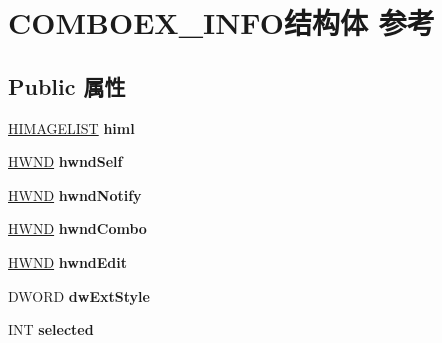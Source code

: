 \hypertarget{struct_c_o_m_b_o_e_x___i_n_f_o}{}\section{C\+O\+M\+B\+O\+E\+X\+\_\+\+I\+N\+F\+O结构体 参考}
\label{struct_c_o_m_b_o_e_x___i_n_f_o}
\subsection*{Public 属性}
\begin{DoxyCompactItemize}
\item 
\mbox{\label{struct_c_o_m_b_o_e_x___i_n_f_o_af0dd24249fbad4a4490643c3834d3b45}} 
\hyperlink{struct___i_m_a_g_e_l_i_s_t}{H\+I\+M\+A\+G\+E\+L\+I\+ST} {\bfseries himl}
\item 
\mbox{\label{struct_c_o_m_b_o_e_x___i_n_f_o_ad62874621fa328fc799cd5e44b9e30eb}} 
\hyperlink{interfacevoid}{H\+W\+ND} {\bfseries hwnd\+Self}
\item 
\mbox{\label{struct_c_o_m_b_o_e_x___i_n_f_o_a2ce79da6814debcac15950e0e551d617}} 
\hyperlink{interfacevoid}{H\+W\+ND} {\bfseries hwnd\+Notify}
\item 
\mbox{\label{struct_c_o_m_b_o_e_x___i_n_f_o_ab4244894bc1031058be0e56f14382e2f}} 
\hyperlink{interfacevoid}{H\+W\+ND} {\bfseries hwnd\+Combo}
\item 
\mbox{\label{struct_c_o_m_b_o_e_x___i_n_f_o_a54d02be30fd61e7846878d5f903046dd}} 
\hyperlink{interfacevoid}{H\+W\+ND} {\bfseries hwnd\+Edit}
\item 
\mbox{\label{struct_c_o_m_b_o_e_x___i_n_f_o_a4789bf42ca2162cd73e487d721bd3b3e}} 
D\+W\+O\+RD {\bfseries dw\+Ext\+Style}
\item 
\mbox{\label{struct_c_o_m_b_o_e_x___i_n_f_o_a5a1ad655a452624bb1866d9f43ae2d4c}} 
I\+NT {\bfseries selected}
\item 
\mbox{\label{struct_c_o_m_b_o_e_x___i_n_f_o_a55f1ce9fc912cf232e9bdc3fba33d992}} 

\end{DoxyCompactItemize}
